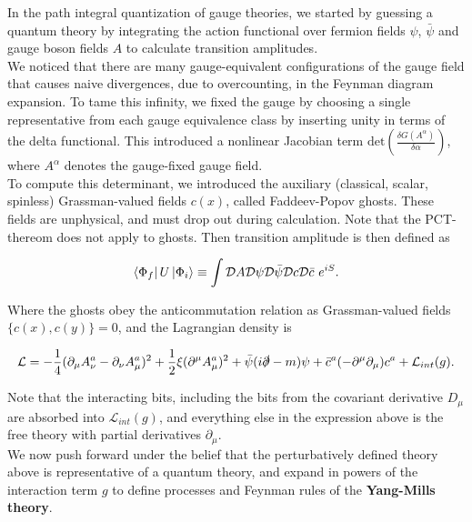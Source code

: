\documentclass[10pt]{article}
\begin{document}
\noindent In the path integral quantization of gauge theories, we started by guessing a quantum theory by integrating the action functional over fermion fields $\psi$, $\bar{\psi}$ and gauge boson fields $A$ to calculate transition amplitudes. \\

\noindent We noticed that there are many gauge-equivalent configurations of the gauge field that causes naive divergences, due to overcounting, in the Feynman diagram expansion. To tame this infinity, we fixed the gauge by choosing a single representative from each gauge equivalence class by inserting unity in terms of the delta functional. This introduced a nonlinear Jacobian term  $\text{det} \left( \frac{\delta G(A^\alpha)}{\delta \alpha} \right)$, where $A^\alpha$ denotes the gauge-fixed gauge field. \\

\noindent To compute this determinant, we introduced the auxiliary (classical, scalar, spinless) Grassman-valued fields $c(x)$, called Faddeev-Popov ghosts. These fields are unphysical, and must drop out during calculation. Note that the PCT-thereom does not apply to ghosts. Then transition amplitude is then defined as

\begin{equation}
\bra{\Phi_f} U \ket{\Phi_i} \equiv \int \mathcal{D} A \mathcal{D} \psi \mathcal{D} \bar{\psi} \mathcal{D} c \mathcal{D} \bar{c} \,\, e^{i S}.
\end{equation}

\noindent Where the ghosts obey the anticommutation relation as Grassman-valued fields $\{c(x), c(y)\} = 0$, and the Lagrangian density is

\begin{equation}
\mathcal{L} = -\frac{1}{4} (\partial_\mu A_\nu^a - \partial_\nu A_\mu^a)^2 + \frac{1}{2} \xi (\partial^\mu A_\mu^a)^2 + \bar{\psi} (i \slashed{\partial} - m) \psi + \bar{c}^a (-\partial^\mu \partial_\mu ) c^a + \mathcal{L}_{int} (g) .
\end{equation}

\noindent Note that the interacting bits, including the bits from the covariant derivative $D_\mu$ are absorbed into $\mathcal{L}_{int} (g)$, and everything else in the expression above is the free theory with partial derivatives $\partial_\mu$. \\

\noindent We now push forward under the belief that the perturbatively defined theory above is representative of a quantum theory, and expand in powers of the interaction term $g$ to define processes and Feynman rules of the \textbf{Yang-Mills theory}.
\end{document}
